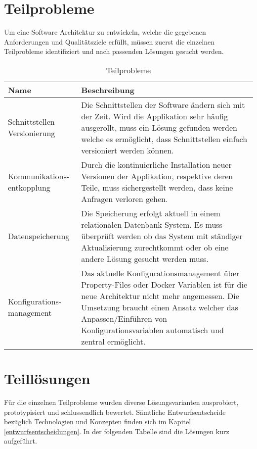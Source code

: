 \section{Teilprobleme}	

Um eine Software Architektur zu entwickeln, welche die gegebenen Anforderungen und Qualitätsziele erfüllt, müssen zuerst die einzelnen Teilprobleme identifiziert und nach passenden Lösungen gesucht werden.

\begin{table}[H]
	\centering
	\caption{Teilprobleme}
	\begin{tabular}{ | p{4cm} | p{11cm} | }
		\toprule
		{\textbf{Name}} & {\textbf{Beschreibung}} \\
		\midrule
		Schnittstellen Versionierung & Die Schnittstellen der Software ändern sich mit der Zeit. Wird die Applikation sehr häufig ausgerollt, muss ein Lösung gefunden werden welche es ermöglicht, dass Schnittstellen einfach versioniert werden können.\\ \hline
		Kommunikations- entkopplung &  Durch die kontinuierliche Installation neuer Versionen der Applikation, respektive deren Teile, muss sichergestellt werden, dass keine Anfragen verloren gehen.\\ \hline
		Datenspeicherung &  Die Speicherung erfolgt aktuell in einem relationalen Datenbank System. Es muss überprüft werden ob das System mit ständiger Aktualisierung zurechtkommt oder ob eine andere Lösung gesucht werden muss.\\ \hline
		Konfigurations- management & Das aktuelle Konfigurationsmanagement über Property-Files oder Docker Variablen ist für die neue Architektur nicht mehr angemessen. Die Umsetzung braucht einen Ansatz welcher das Anpassen/Einführen von Konfigurationsvariablen automatisch und zentral ermöglicht. \\
		\bottomrule
	\end{tabular}
\end{table}

\section{Teillösungen}

Für die einzelnen Teilprobleme wurden diverse Lösungsvarianten ausprobiert, prototypisiert und schlussendlich bewertet. Sämtliche Entwurfsentscheide bezüglich Technologien und Konzepten finden sich im Kapitel \ref{entwurfsentscheidungen}. In der folgenden Tabelle sind die Lösungen kurz aufgeführt.

